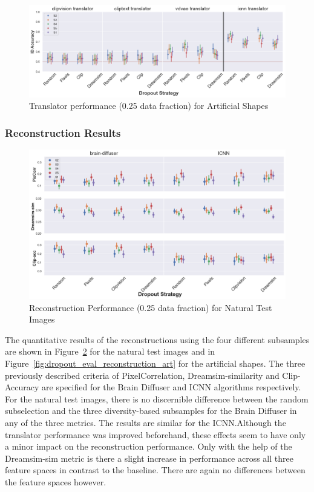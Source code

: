 \begin{figure}[ht]
  \centering
  \includegraphics[width=1\textwidth]{plots/dropout_eval_translator_art.png}
  \caption{Translator performance (0.25 data fraction) for Artificial Shapes}\label{fig:dropout_eval_translator_art}
\end{figure}


\subsubsection{Reconstruction Results}

\begin{figure}[ht]
  \centering
  \includegraphics[width=1\textwidth]{plots/dropout_eval_reconstruction_test.png}
  \caption{Reconstruction Performance (0.25 data fraction) for Natural Test Images}\label{fig:dropout_eval_reconstruction_test}
\end{figure}

The quantitative results of the reconstructions using the four different subsamples are shown in Figure~\ref{fig:dropout_eval_reconstruction_test} for the natural test images and in Figure~\ref{fig:dropout_eval_reconstruction_art} for the artificial shapes. The three previously described criteria of PixelCorrelation, Dreamsim-similarity and Clip-Accuracy are specified for the Brain Diffuser and ICNN algorithms respectively. For the natural test images, there is no discernible difference between the random subselection and the three diversity-based subsamples for the Brain Diffuser in any of the three metrics. The results are similar for the ICNN.\@ Although the translator performance was improved beforehand, these effects seem to have only a minor impact on the reconstruction performance. Only with the help of the Dreamsim-sim metric is there a slight increase in performance across all three feature spaces in contrast to the baseline. There are again no differences between the feature spaces however.

